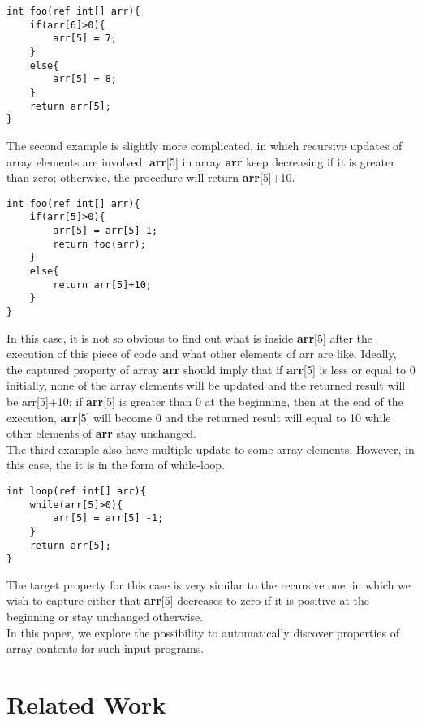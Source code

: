\documentclass[]{article}
\begin{document}
\begin{lstlisting}
int foo(ref int[] arr){
	if(arr[6]>0){
		arr[5] = 7;
	}
	else{
		arr[5] = 8;
	}
	return arr[5];
}
\end{lstlisting}

The second example is slightly more complicated, in which recursive updates of array elements are involved. \textbf{arr}[5] in array \textbf{arr} keep decreasing if it is greater than zero; otherwise, the procedure will return \textbf{arr}[5]+10.\\

\begin{lstlisting}
int foo(ref int[] arr){
	if(arr[5]>0){
		arr[5] = arr[5]-1;
		return foo(arr);
	}
	else{
		return arr[5]+10;
	}
}
\end{lstlisting}
In this case, it is not so obvious to find out what is inside \textbf{arr}[5] after the execution of this piece of code and what other elements of arr are like. Ideally, the captured property of array \textbf{arr} should imply that if \textbf{arr}[5] is less or equal to 0 initially, none of the array elements will be updated and the returned result will be arr[5]+10; if \textbf{arr}[5] is greater than 0 at the beginning, then at the end of the execution, \textbf{arr}[5] will become 0 and the returned result will equal to 10 while other elements of \textbf{arr} stay unchanged.\\

The third example also have multiple update to some array elements. However, in this case, the it is in the form of while-loop.\\
\begin{lstlisting}
int loop(ref int[] arr){
	while(arr[5]>0){
		arr[5] = arr[5] -1;
	}
	return arr[5];
}
\end{lstlisting}

The target property for this case is very similar to the recursive one, in which we wish to capture either that \textbf{arr}[5] decreases to zero if it is positive at the beginning or stay unchanged otherwise.\\

In this paper, we explore the possibility to automatically discover properties of array contents for such input programs.

\section{Related Work}
\end{document}

